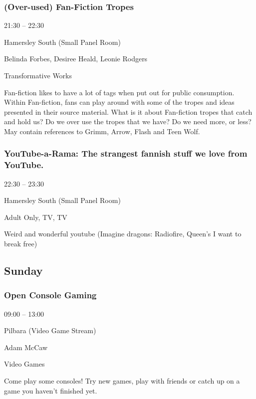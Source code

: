 \documentclass{scrreprt}
\begin{document}
\begin{multicols}{2}
\subsubsection*{(Over-used) Fan-Fiction Tropes}\begin{description}
\setlength{\itemsep}{0pt}
\setlength{\parsep}{0pt}
\setlength{\parskip}{0pt}
\item[Time:]{21:30 -- 22:30}
\item[Venue:]{Hamersley South (Small Panel Room)}
\item[People:]{Belinda Forbes, Desiree Heald, Leonie Rodgers}
\item[Tags:]{Transformative Works}\end{description}
Fan-fiction likes to have a lot of tags when put out for public consumption. Within Fan-fiction, fans can play around with some of the tropes and ideas presented in their source material. What is it about Fan-fiction tropes that catch and hold us? Do we over use the tropes that we have? Do we need more, or less? May contain references to Grimm, Arrow, Flash and Teen Wolf.
\subsubsection*{YouTube-a-Rama: The strangest fannish stuff we love from YouTube.}\begin{description}
\setlength{\itemsep}{0pt}
\setlength{\parsep}{0pt}
\setlength{\parskip}{0pt}
\item[Time:]{22:30 -- 23:30}
\item[Venue:]{Hamersley South (Small Panel Room)}
\item[Tags:]{Adult Only, TV, TV}\end{description}
Weird and wonderful youtube (Imagine dragons: Radiofire, Queen's I want to break free)
\subsection*{Sunday}\subsubsection*{Open Console Gaming}\begin{description}
\setlength{\itemsep}{0pt}
\setlength{\parsep}{0pt}
\setlength{\parskip}{0pt}
\item[Time:]{09:00 -- 13:00}
\item[Venue:]{Pilbara (Video Game Stream)}
\item[People:]{Adam McCaw}
\item[Tags:]{Video Games}\end{description}
Come play some consoles! Try new games, play with friends or catch up on a game you haven't finished yet.

\end{multicols}
\end{document}
